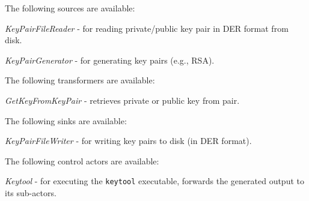 \documentclass[a4paper]{book}
\begin{document}
\noindent The following sources are available:
\begin{tight_itemize}
  \item \textit{KeyPairFileReader} - for reading private/public key pair in
  DER format from disk.
  \item \textit{KeyPairGenerator} - for generating key pairs (e.g., RSA).
\end{tight_itemize}

\noindent The following transformers are available:
\begin{tight_itemize}
  \item \textit{GetKeyFromKeyPair} - retrieves private or public key from pair.
\end{tight_itemize}

\noindent The following sinks are available:
\begin{tight_itemize}
  \item \textit{KeyPairFileWriter} - for writing key pairs to disk (in DER format).
\end{tight_itemize}

\noindent The following control actors are available:
\begin{tight_itemize}
  \item \textit{Keytool} - for executing the \verb|keytool| executable, forwards
  the generated output to its sub-actors.
\end{tight_itemize}


\end{document}
